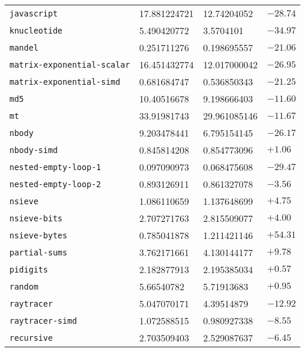 \begin{longtable}{llll}
\texttt{javascript}               & 17.881224721      & 12.74204052         & $-28.74$    \\
\texttt{knucleotide}              & 5.490420772       & 3.5704101           & $-34.97$    \\
\texttt{mandel}                   & 0.251711276       & 0.198695557         & $-21.06$    \\
\texttt{matrix-exponential-scalar}& 16.451432774      & 12.017000042        & $-26.95$    \\
\texttt{matrix-exponential-simd}  & 0.681684747       & 0.536850343         & $-21.25$    \\
\texttt{md5}                      & 10.40516678       & 9.198666403         & $-11.60$    \\
\texttt{mt}                       & 33.91981743       & 29.961085146        & $-11.67$    \\
\texttt{nbody}                    & 9.203478441       & 6.795154145         & $-26.17$    \\
\texttt{nbody-simd}               & 0.845814208       & 0.854773096         & $+1.06$     \\
\texttt{nested-empty-loop-1}      & 0.097090973       & 0.068475608         & $-29.47$    \\
\texttt{nested-empty-loop-2}      & 0.893126911       & 0.861327078         & $-3.56$     \\
\texttt{nsieve}                   & 1.086110659       & 1.137648699         & $+4.75$     \\
\texttt{nsieve-bits}              & 2.707271763       & 2.815509077         & $+4.00$     \\
\texttt{nsieve-bytes}             & 0.785041878       & 1.211421146         & $+54.31$    \\
\texttt{partial-sums}             & 3.762171661       & 4.130144177         & $+9.78$     \\
\texttt{pidigits}                 & 2.182877913       & 2.195385034         & $+0.57$     \\
\texttt{random}                   & 5.66540782        & 5.71913683          & $+0.95$     \\
\texttt{raytracer}                & 5.047070171       & 4.39514879          & $-12.92$    \\
\texttt{raytracer-simd}           & 1.072588515       & 0.980927338         & $-8.55$     \\
\texttt{recursive}                & 2.703509403       & 2.529087637         & $-6.45$     \\

\end{longtable}
